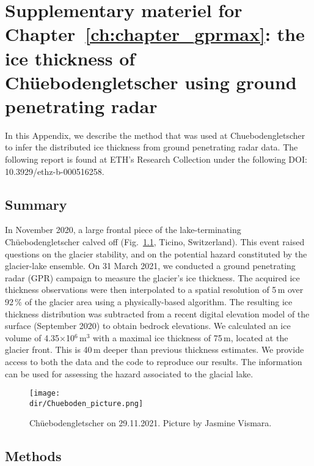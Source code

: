\begin{sidewaystable}
\begin{tabular}{l l l c c c l r}
        
    \end{tabular}
\end{sidewaystable}


\chapter{Supplementary materiel for Chapter~\ref{ch:chapter_gprmax}: the ice thickness of Chüebodengletscher using ground penetrating radar}
\label{ch:chueboden}

In this Appendix, we describe the method that was used at Chuebodengletscher to infer the distributed ice thickness from ground penetrating radar data. The following report is found at ETH's Research Collection under the following DOI: 10.3929/ethz-b-000516258.

\section{Summary}

In November 2020, a large frontal piece of the lake-terminating Chüebodengletscher calved off (Fig.~\ref{fig:photo}, Ticino, Switzerland). This event raised questions on the glacier stability, and on the potential hazard constituted by the glacier-lake ensemble. 
On 31 March 2021, we conducted a ground penetrating radar (GPR) campaign to measure the glacier's ice thickness. The acquired ice thickness observations were then interpolated to a spatial resolution of 5\,m over 92\,\% of the glacier area using a physically-based algorithm. The resulting ice thickness distribution was subtracted from a recent digital elevation model of the surface (September 2020) to obtain bedrock elevations. We calculated an ice volume of 4.35$\times$10$^6$\,m$^3$ with a maximal ice thickness of 75\,m, located at the glacier front. This is 40\,m deeper than previous thickness estimates. We provide access to both the data and the code to reproduce our results. The information can be used for assessing the hazard associated to the glacial lake.  

\begin{figure}
\centering
\texttt{[image: \\dir/Chueboden\_picture.png]}
\caption{Chüebodengletscher on 29.11.2021. Picture by Jasmine Vismara.}
\label{fig:photo}
\end{figure}


\section{Methods}

